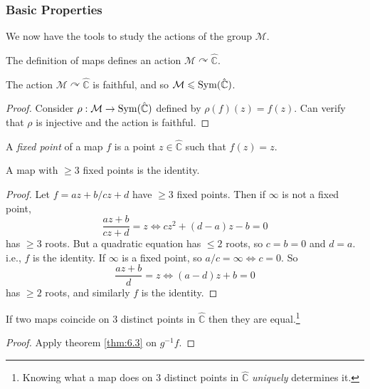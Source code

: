 \documentclass[a4paper]{article}
\begin{document}
      \subsubsection{Basic Properties}
      We now have the tools to study the actions of the \mobius group $ \mathcal{M} $.
      \begin{remark}
          The definition of \mobius maps defines an action $ \mathcal{M} \curvearrowright \hat{\mathbb{C}} $.
      \end{remark}
      \begin{proposition}\label{prop:6.1}
          The action $ \mathcal{M} \curvearrowright \hat{\mathbb{C}} $ is faithful, and so $ \mathcal{M}\leqslant \operatorname{Sym}(\hat{\mathbb{C}}) $.
      \end{proposition}
      \begin{proof}
          Consider $ \rho: \mathcal{M} \to \operatorname{Sym}(\hat{\mathbb{C}}) $ defined by $ \rho(f)(z)=f(z) $. Can verify that $ \rho $ is injective and the action is faithful.
      \end{proof}
      \begin{definition}
          A \textit{fixed point} of a \mobius map $f$ is a point $z\in \hat{\mathbb{C}}$ such that $ f(z)=z $.
      \end{definition}
      \begin{theorem}\label{thm:6.3}
          A \mobius map with $\ge 3$ fixed points is the identity.
      \end{theorem}
      \begin{proof}
          Let $ f=az+b/cz+d $ have $\ge 3$ fixed points. Then if $\infty$ is not a fixed point,
          \[
             \frac{az+b}{cz+d}=z \Longleftrightarrow cz^2+(d-a)z-b=0
          \]
          has $\ge 3$ roots. But a quadratic equation has $\le 2$ roots, so $c=b=0$ and $d=a$. i.e., $f$ is the identity.
          If $\infty$ is a fixed point, so $ a/c=\infty \Leftrightarrow c=0 $. So 
          \[
              \frac{az+b}{d}=z \Longleftrightarrow (a-d)z+b=0
          \]
          has $\ge 2$ roots, and similarly $f$ is the identity.
      \end{proof}
      \begin{corollary}\label{col:6.4}
              If two \mobius maps coincide on 3 distinct points in $ \hat{\mathbb{C}} $ then they are equal.\footnote{Knowing what a \mobius map does on 3 distinct points in $ \hat{\mathbb{C}} $ \textit{uniquely} determines it.}
      \end{corollary}
      \begin{proof}
          Apply theorem \ref{thm:6.3} on $g^{-1}f$.
      \end{proof}
\end{document}
